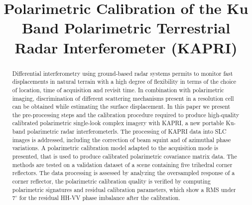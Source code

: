 \documentclass[12pt]{IEEEtran}
\title{Polarimetric Calibration of the Ku Band Polarimetric Terrestrial Radar Interferometer (KAPRI)}
\author{\IEEEauthorblockN{
	Simone Baffelli,
	Othmar Frey,
	Charles Werner,
	Irena Hajnsek
}}
\begin{document}
\maketitle
\begin{abstract}
Differential interferometry using ground-based radar systems permits to monitor fast displacements in natural terrain with a high degree of flexibility in terms of the choice of location, time of acquisition and revisit time. In combination with polarimetric imaging, discrimination of different scattering mechanisms present in a resolution cell can be obtained while estimating the surface displacement.
In this paper we present the pre-processing steps and the calibration procedure required to produce high-quality calibrated polarimetric single-look complex imagery with KAPRI, a new portable Ku-band polarimetric radar interferometerls. The processing of KAPRI data into SLC images is addressed, including the correction of beam squint and of azimuthal phase variations. A polarimetric calibration model adapted to the acquisition mode is presented, that is used to produce calibrated polarimetric covariance matrix data. The methods are tested on a validation dataset of a scene containing five trihedral corner reflectors. The data processing is assessed by analyzing the oversampled response of a corner reflector, the polarimetric calibration quality is verified by computing polarimetric signatures and residual calibration parameters, which show a RMS under $\mathrm{7^\circ}$ for the residual HH-VV phase imbalance after the calibration.
\end{abstract}





\pagebreak


\end{document}
